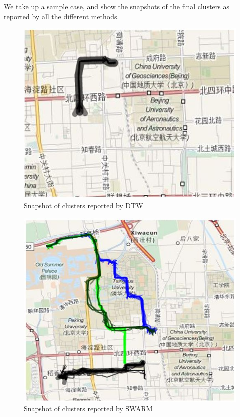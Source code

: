 We take up a sample case, and show the snapshots of the final clusters as reported by all the different methods. 

\begin{figure}[H]
\centering   
\includegraphics[scale=0.4]{figs/casestudy_dtw.jpg}
\caption{Snapshot of clusters reported by DTW}
\label{fig:casestudy_dtw}  
\end{figure} 
\begin{figure}
\centering     
\includegraphics[scale=0.4]{figs/casestudy_swarm.jpg}
\caption{Snapshot of clusters reported by SWARM }
\label{fig:casestudy_swarm}  
\end{figure} 
